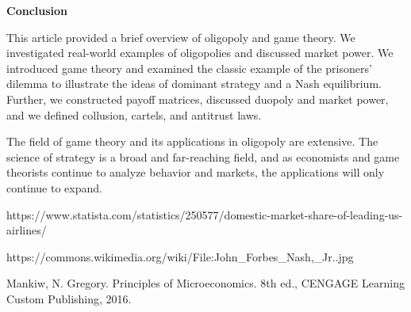 \noindent
\textbf{Conclusion}

This article provided a brief overview of oligopoly and game theory. We investigated real-world examples of oligopolies and discussed market power. We introduced game theory and examined the classic example of the prisoners’ dilemma to illustrate the ideas of dominant strategy and a Nash equilibrium. Further, we constructed payoff matrices, discussed duopoly and market power, and we defined collusion, cartels, and antitrust laws.

The field of game theory and its applications in oligopoly are extensive. The science of strategy is a broad and far-reaching field, and as economists and game theorists continue to analyze behavior and markets, the applications will only continue to expand.



\pagebreak
\begin{thebibliography}{3}

\bibitem{} 
https://www.statista.com/statistics/250577/domestic-market-share-of-leading-us-airlines/

\bibitem{}
https://commons.wikimedia.org/wiki/File:John\_Forbes\_Nash,\_Jr..jpg

\bibitem{}
Mankiw, N. Gregory. Principles of Microeconomics. 8th ed., CENGAGE Learning Custom Publishing, 2016.

\end{thebibliography}
